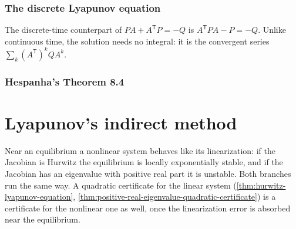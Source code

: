 

\subsection{The discrete Lyapunov equation}

The discrete-time counterpart of $PA + A^{\mathsf T}P = -Q$ is $A^{\mathsf T}PA - P = -Q$.
Unlike continuous time, the solution needs no integral: it is the convergent series
$\sum_{k} (A^{\mathsf T})^{k}QA^{k}$.









\subsection{Hespanha's Theorem 8.4}


\chapter{Lyapunov's indirect method}

Near an equilibrium a nonlinear system behaves like its linearization: if the Jacobian is Hurwitz
the equilibrium is locally exponentially stable, and if the Jacobian has an eigenvalue with
positive real part it is unstable.  Both branches run the same way.  A quadratic certificate for
the linear system (\cref{thm:hurwitz-lyapunov-equation},
\cref{thm:positive-real-eigenvalue-quadratic-certificate}) is a certificate for the nonlinear one
as well, once the linearization error is absorbed near the equilibrium.


